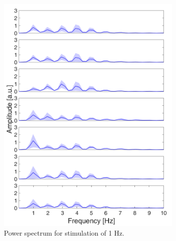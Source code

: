 \documentclass{pracalicmgr}
\begin{document}
    \begin{figure}[H]
    	\begin{subfigure}{.5\textwidth}
    		\centering
		\includegraphics[width=1.\linewidth]{widmo_1Hz.png}
		\caption{Power spectrum for stimulation of 1 Hz.}
		\label{rys:widmo_1Hz}
    	\end{subfigure}
    	\begin{subfigure}{.5\textwidth}
    		\centering

\end{subfigure}
\end{figure}
\end{document}
